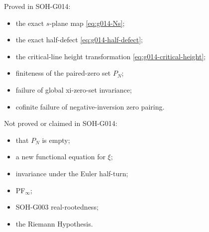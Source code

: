 Proved in SOH-G014:
\begin{itemize}
 \item the exact $s$-plane map \cref{eq:g014-Ns};
 \item the exact half-defect \cref{eq:g014-half-defect};
 \item the critical-line height transformation \cref{eq:g014-critical-height};
 \item finiteness of the paired-zero set $P_N$;
 \item failure of global xi-zero-set invariance;
 \item cofinite failure of negative-inversion zero pairing.
\end{itemize}

Not proved or claimed in SOH-G014:
\begin{itemize}
 \item that $P_N$ is empty;
 \item a new functional equation for $\xi$;
 \item invariance under the Euler half-turn;
 \item PF$_\infty$;
 \item SOH-G003 real-rootedness;
 \item the Riemann Hypothesis.
\end{itemize}
